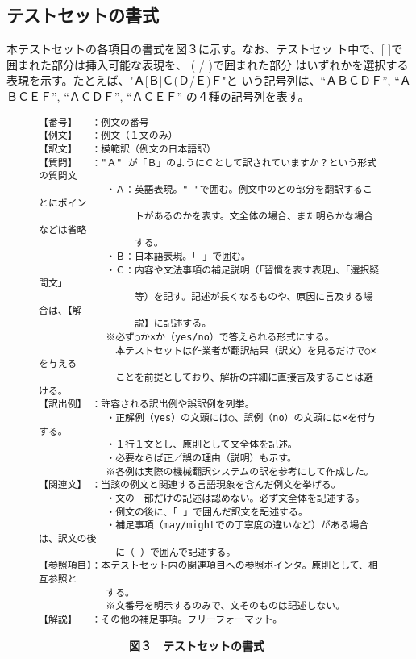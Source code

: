 \subsection{テストセットの書式}

本テストセットの各項目の書式を図３に示す。なお、テストセッ
ト中で、[ ]で囲まれた部分は挿入可能な表現を、 ( / )で囲まれた部分
はいずれかを選択する表現を示す。たとえば、"Ａ[Ｂ]Ｃ(Ｄ/Ｅ)Ｆ"と
いう記号列は、``ＡＢＣＤＦ'', ``ＡＢＣＥＦ'', ``ＡＣＤＦ'',
``ＡＣＥＦ'' 
の４種の記号列を表す。

\begin{figure}
\begin{verbatim}
【番号】　　：例文の番号
【例文】　　：例文（１文のみ）
【訳文】　　：模範訳（例文の日本語訳）
【質問】　　："Ａ" が「Ｂ」のようにＣとして訳されていますか？という形式の質問文
　　　　　　　・Ａ：英語表現。" "で囲む。例文中のどの部分を翻訳することにポイン
　　　　　　　　　　トがあるのかを表す。文全体の場合、また明らかな場合などは省略
　　　　　　　　　　する。
　　　　　　　・Ｂ：日本語表現。「 」で囲む。
　　　　　　　・Ｃ：内容や文法事項の補足説明（「習慣を表す表現」、「選択疑問文」
　　　　　　　　　　等）を記す。記述が長くなるものや、原因に言及する場合は、【解
　　　　　　　　　　説】に記述する。
　　　　　　　※必ず○か×か（yes/no）で答えられる形式にする。
　　　　　　　　本テストセットは作業者が翻訳結果（訳文）を見るだけで○×を与える
　　　　　　　　ことを前提としており、解析の詳細に直接言及することは避ける。
【訳出例】　：許容される訳出例や誤訳例を列挙。
　　　　　　　・正解例（yes）の文頭には○、誤例（no）の文頭には×を付与する。
　　　　　　　・１行１文とし、原則として文全体を記述。
　　　　　　　・必要ならば正／誤の理由（説明）も示す。
　　　　　　　※各例は実際の機械翻訳システムの訳を参考にして作成した。
【関連文】　：当該の例文と関連する言語現象を含んだ例文を挙げる。
　　　　　　　・文の一部だけの記述は認めない。必ず文全体を記述する。
　　　　　　　・例文の後に、「 」で囲んだ訳文を記述する。
　　　　　　　・補足事項（may/mightでの丁寧度の違いなど）がある場合は、訳文の後
　　　　　　　　に（ ）で囲んで記述する。
【参照項目】：本テストセット内の関連項目への参照ポインタ。原則として、相互参照と
　　　　　　　する。
　　　　　　　※文番号を明示するのみで、文そのものは記述しない。
【解説】　　：その他の補足事項。フリーフォーマット。

\end{verbatim}
{\bf　　　　　　　　図３　テストセットの書式}

\end{figure}

